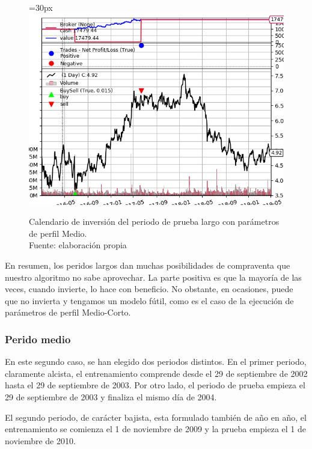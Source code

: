      	\begin{figure}[H]
     		\centering\leftskip=30px
     		\includegraphics[scale=0.72]{imagenes/L_Medium_test.png}
     		\caption[Calendario de inversi\'on del periodo de prueba largo]{Calendario de inversi\'on del periodo de prueba largo con par\'ametros de perfil Medio.\\ Fuente: elaboraci\'on propia}
     		\label{fig:large_period_mtest}
     	\end{figure}     	

En resumen, los peridos largos dan muchas posibilidades de compraventa que nuestro algoritmo no sabe aprovechar. La parte positiva es que la mayor\'ia de las veces, cuando invierte, lo hace con beneficio. No obstante, en ocasiones, puede que no invierta y tengamos un modelo f\'util, como es el caso de la ejecuci\'on de par\'ametros de perfil Medio-Corto.

\subsubsection{Perido medio}

En este segundo caso, se han elegido dos periodos distintos. En el primer periodo, claramente alcista, el entrenamiento comprende desde el 29 de septiembre de 2002 hasta el 29 de septiembre de 2003. Por otro lado, el periodo de prueba empieza el 29 de septiembre de 2003 y finaliza el mismo d\'ia de 2004. 

El segundo periodo, de car\'acter bajista, esta formulado tambi\'en de a\~no en a\~no, el entrenamiento se comienza el 1 de noviembre de 2009 y la prueba empieza el 1 de noviembre de 2010.

